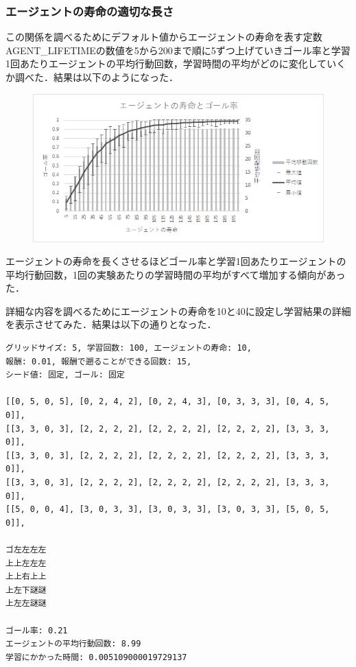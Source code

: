 \documentclass[a4j,11pt]{jarticle}
\begin{document}
\newpage

\subsubsection{エージェントの寿命の適切な長さ}

この関係を調べるためにデフォルト値からエージェントの寿命を表す定数AGENT\_LIFETIMEの数値を5から200まで順に5ずつ上げていきゴール率と学習1回あたりエージェントの平均行動回数，学習時間の平均がどのに変化していくか調べた．結果は以下のようになった．

\begin{figure}[ht]
  \begin{center}
    \includegraphics[scale=1.5]{img/changeAgentLifetime.png}
  \end{center}
\end{figure}

エージェントの寿命を長くさせるほどゴール率と学習1回あたりエージェントの平均行動回数，1回の実験あたりの学習時間の平均がすべて増加する傾向があった．

詳細な内容を調べるためにエージェントの寿命を10と40に設定し学習結果の詳細を表示させてみた．結果は以下の通りとなった．

\begin{verbatim}
グリッドサイズ: 5, 学習回数: 100, エージェントの寿命: 10,
報酬: 0.01, 報酬で遡ることができる回数: 15,
シード値: 固定, ゴール: 固定

[[0, 5, 0, 5], [0, 2, 4, 2], [0, 2, 4, 3], [0, 3, 3, 3], [0, 4, 5, 0]],
[[3, 3, 0, 3], [2, 2, 2, 2], [2, 2, 2, 2], [2, 2, 2, 2], [3, 3, 3, 0]],
[[3, 3, 0, 3], [2, 2, 2, 2], [2, 2, 2, 2], [2, 2, 2, 2], [3, 3, 3, 0]],
[[3, 3, 0, 3], [2, 2, 2, 2], [2, 2, 2, 2], [2, 2, 2, 2], [3, 3, 3, 0]],
[[5, 0, 0, 4], [3, 0, 3, 3], [3, 0, 3, 3], [3, 0, 3, 3], [5, 0, 5, 0]],

ゴ左左左左
上上左左左
上上右上上
上左下謎謎
上左左謎謎

ゴール率: 0.21
エージェントの平均行動回数: 8.99
学習にかかった時間: 0.005109000019729137
\end{verbatim}
\end{document}
